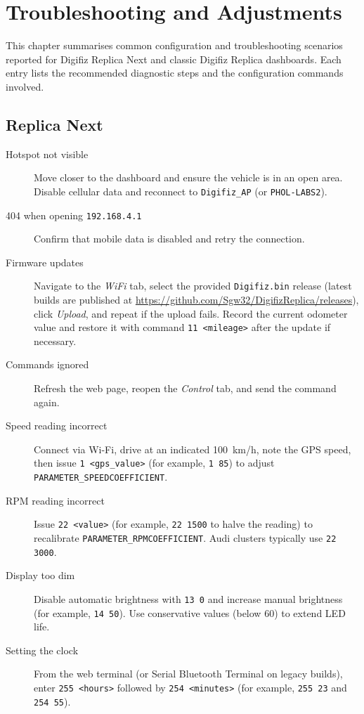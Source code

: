 \chapter{Troubleshooting and Adjustments} \label{ch:Tips}

This chapter summarises common configuration and troubleshooting scenarios reported for Digifiz Replica Next and classic Digifiz Replica dashboards.
Each entry lists the recommended diagnostic steps and the configuration commands involved.

\section{Replica Next}

\begin{description}
    \item[Hotspot not visible] Move closer to the dashboard and ensure the vehicle is in an open area. Disable cellular data and reconnect to \texttt{Digifiz\_AP} (or \texttt{PHOL-LABS2}).
    \item[404 when opening \texttt{192.168.4.1}] Confirm that mobile data is disabled and retry the connection.
    \item[Firmware updates] Navigate to the \emph{WiFi} tab, select the provided \texttt{Digifiz.bin} release (latest builds are published at \url{https://github.com/Sgw32/DigifizReplica/releases}), click \emph{Upload}, and repeat if the upload fails. Record the current odometer value and restore it with command \verb|11 <mileage>| after the update if necessary.
    \item[Commands ignored] Refresh the web page, reopen the \emph{Control} tab, and send the command again.
    \item[Speed reading incorrect] Connect via Wi-Fi, drive at an indicated 100~km/h, note the GPS speed, then issue \verb|1 <gps_value>| (for example, \verb|1 85|) to adjust \texttt{PARAMETER\_SPEEDCOEFFICIENT}.
    \item[RPM reading incorrect] Issue \verb|22 <value>| (for example, \verb|22 1500| to halve the reading) to recalibrate \texttt{PARAMETER\_RPMCOEFFICIENT}. Audi clusters typically use \verb|22 3000|.
    \item[Display too dim] Disable automatic brightness with \verb|13 0| and increase manual brightness (for example, \verb|14 50|). Use conservative values (below 60) to extend LED life.
    \item[Setting the clock] From the web terminal (or Serial Bluetooth Terminal on legacy builds), enter \verb|255 <hours>| followed by \verb|254 <minutes>| (for example, \verb|255 23| and \verb|254 55|).

\end{description}
